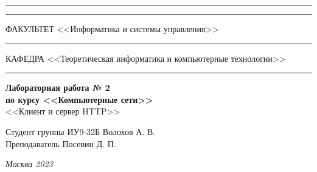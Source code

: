 \documentclass[a4paper, 14pt]{extarticle}
\begin{document}
\begin{titlepage}
\vspace{-25pt}
\hspace{-35pt}\rule{\textwidth}{2.3pt}

\vspace*{-20.3pt}
\hspace{-35pt}\rule{\textwidth}{0.4pt}

\vspace{1.5ex}
\hspace{-35pt} \noindent \small ФАКУЛЬТЕТ\hspace{80pt} <<Информатика и системы управления>>

\vspace*{-16pt}
\hspace{47pt}\rule{0.83\textwidth}{0.4pt}

\vspace{0.5ex}
\hspace{-35pt} \noindent \small КАФЕДРА\hspace{50pt} <<Теоретическая информатика и компьютерные технологии>>

\vspace*{-16pt}
\hspace{30pt}\rule{0.866\textwidth}{0.4pt}
  
\vspace{11em}

\begin{center}
\Large {\bf Лабораторная работа № 2} \\ 
\large {\bf по курсу <<Компьютерные сети>>} \\
\large <<Клиент и сервер HTTP>> 
\end{center}\normalsize

\vspace{8em}


\begin{flushright}
  {Студент группы ИУ9-32Б Волохов А. В. \hspace*{15pt}\\ 
  \vspace{2ex}
  Преподаватель Посевин Д. П.\hspace*{15pt}}
\end{flushright}

\bigskip

\vfill
 

\begin{center}
\textsl{Москва 2023}
\end{center}
\end{titlepage}
\end{document}
